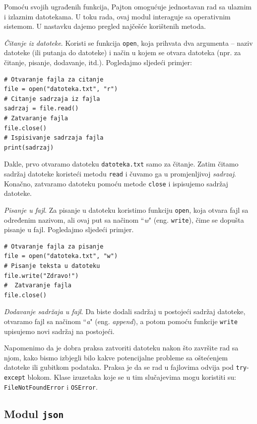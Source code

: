 Pomoću svojih ugrađenih funkcija, Pajton omogućuje jednostavan rad sa ulaznim i izlaznim datotekama. U toku rada, ovaj modul interaguje sa operativnim sistemom. 
U nastavku dajemo pregled najčešće korište\-nih metoda.

\textit{Čitanje iz datoteke}. Koristi se funkcija \texttt{open}, koja prihvata dva argu\-menta -- naziv datoteke (ili putanja do datoteke) i način u kojem se otvara datoteka (npr. za čitanje, pisanje, dodavanje, itd.). Pogledajmo sljedeći primjer: 
\begin{verbatim}
# Otvaranje fajla za citanje
file = open("datoteka.txt", "r")
# Citanje sadrzaja iz fajla 
sadrzaj = file.read()
# Zatvaranje fajla
file.close()
# Ispisivanje sadrzaja fajla 
print(sadrzaj)
\end{verbatim}

Dakle, prvo otvaramo datoteku  \texttt{datoteka.txt} samo za čitanje. Zatim čitamo sadržaj datoteke koristeći metodu \texttt{read} i čuvamo ga u promjenljivoj \textit{sadrzaj}. Konačno, zatvaramo datoteku pomoću metode \texttt{close} i ispisujemo sadržaj datoteke. 



\textit{Pisanje u fajl}. Za pisanje u datoteku koristimo funkciju \texttt{open}, koja otvara fajl sa određenim nazivom, ali ovaj put sa načinom ``\textit{w}" (eng. \texttt{write}), čime se dopušta pisanje u fajl. Pogledajmo sljedeći primjer.
\begin{verbatim}
# Otvaranje fajla za pisanje
file = open("datoteka.txt", "w")
# Pisanje teksta u datoteku
file.write("Zdravo!")
#  Zatvaranje fajla 
file.close()
\end{verbatim}


\textit{Dodavanje sadržaja u fajl}. Da biste dodali sadržaj u postojeći sadržaj datoteke, otvaramo fajl sa načinom ``\textit{a}" (eng. \textit{append}), a potom pomoću funkcije \texttt{write} upisujemo novi sadržaj na postojeći. 

Napomenimo da je dobra praksa zatvoriti datoteku nakon što zavr\-šite rad sa njom, kako bismo izbjegli bilo kakve potencijalne probleme sa oštećenjem datoteke ili gubitkom podataka. Praksa je da se rad u fajlovima odvija pod \texttt{try}-\texttt{except} blokom. Klase izuzetaka koje se u tim slučajevima mogu koristiti su: \texttt{FileNotFoundError} i \texttt{OSError}. 


\subsection{Modul \texttt{json}}

